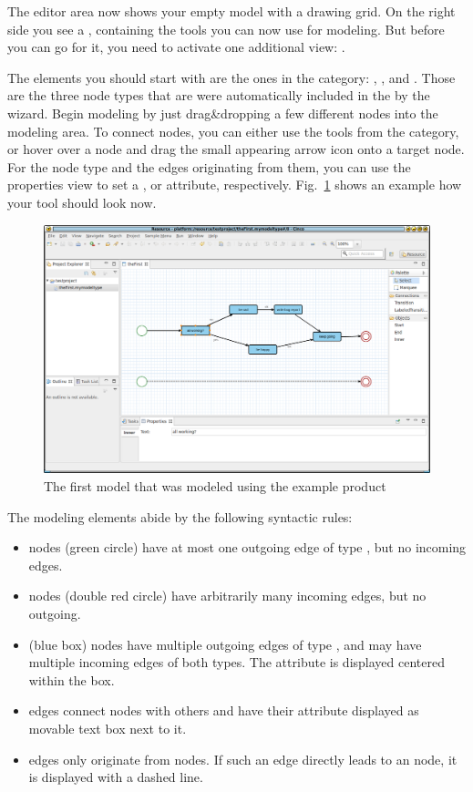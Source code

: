 \documentclass[a4paper,american,12pt]{scrreprt}
\begin{document}
The editor area now shows your empty model with a drawing grid. On the right
side you see a , containing the tools you can now use for modeling.
But before you can go for it, you need to activate one additional view:
.

The elements you should start with are the ones in the 
category: , , and . Those are the three node
types that are were automatically included in the  by the
wizard. Begin modeling by just drag\&dropping a few different nodes into the
modeling area. To connect nodes, you can either use the tools from the
 category, or hover over a node and drag the small
appearing arrow icon onto a target node. For the  node type and the
edges originating from them, you can use the properties view to set a
, or  attribute, respectively. Fig.~\ref{fig:firstModel} shows an example how your tool should look now.

\begin{figure}
	\centering
	\includegraphics[width=.9\textwidth]{screenshots/cp-first-model.png} 
	\caption{The first model that was modeled using the example \cinco product}
	\label{fig:firstModel}
\end{figure}

The modeling elements abide by the following syntactic rules:

\begin{itemize}
\item {} nodes (green circle) have at most one outgoing edge of type
	, but no incoming edges.
\item {} nodes (double red circle) have arbitrarily many incoming edges,
	but no outgoing.
\item {} (blue box) nodes have multiple outgoing edges of type
	, and may have multiple incoming edges of both types.
	The attribute  is displayed centered within the box.
\item {} edges connect  nodes with others and
	have their attribute  displayed as movable text box next to it.
\item {} edges only originate from  nodes. If such an
	edge directly leads to an  node, it is displayed with a dashed
	line.
\end{itemize}
\end{document}
